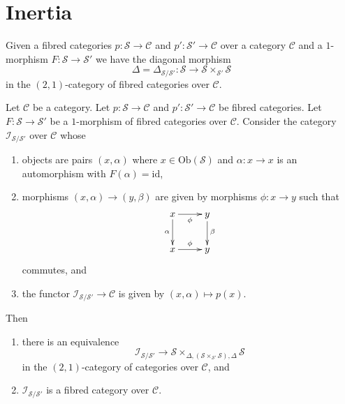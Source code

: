 \section{Inertia}
\label{section-inertia}

\noindent
Given a fibred categories $p : \mathcal{S} \to \mathcal{C}$ and
$p' : \mathcal{S}' \to \mathcal{C}$ over a category $\mathcal{C}$
and a $1$-morphism $F : \mathcal{S} \to \mathcal{S}'$
we have the diagonal morphism
$$
\Delta = \Delta_{\mathcal{S}/\mathcal{S}'} :
\mathcal{S} \longrightarrow \mathcal{S} \times_{\mathcal{S}'} \mathcal{S}
$$
in the $(2, 1)$-category of fibred categories over $\mathcal{C}$.

\begin{lemma}
\label{lemma-intertia-fibred-category}
Let $\mathcal{C}$ be a category. Let
$p : \mathcal{S} \to \mathcal{C}$ and
$p' : \mathcal{S}' \to \mathcal{C}$ be fibred categories.
Let $F : \mathcal{S} \to \mathcal{S}'$ be a $1$-morphism of
fibred categories over $\mathcal{C}$. Consider the category
$\mathcal{I}_{\mathcal{S}/\mathcal{S}'}$ over $\mathcal{C}$ whose
\begin{enumerate}
\item objects are pairs $(x, \alpha)$ where $x \in \text{Ob}(\mathcal{S})$
and $\alpha : x \to x$ is an automorphism with $F(\alpha) = \text{id}$,
\item morphisms $(x, \alpha) \to (y, \beta)$ are given by morphisms
$\phi : x \to y$ such that
$$
\xymatrix{
x\ar[r]_\phi\ar[d]_\alpha &
y\ar[d]^{\beta}	\\
x\ar[r]^\phi &
y \\
}
$$
commutes, and
\item the functor $\mathcal{I}_{\mathcal{S}/\mathcal{S}'} \to \mathcal{C}$
is given by $(x, \alpha) \mapsto p(x)$.
\end{enumerate}
Then
\begin{enumerate}
\item there is an equivalence
$$
\mathcal{I}_{\mathcal{S}/\mathcal{S}'} \longrightarrow
\mathcal{S}
\times_{\Delta, (\mathcal{S} \times_{\mathcal{S}'} \mathcal{S}), \Delta}
\mathcal{S}
$$
in the $(2, 1)$-category of categories over $\mathcal{C}$, and
\item $\mathcal{I}_{\mathcal{S}/\mathcal{S}'}$ is a fibred category over
$\mathcal{C}$.
\end{enumerate}
\end{lemma}

